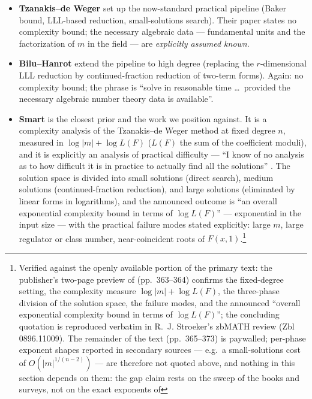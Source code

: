 \documentclass[11pt]{amsart}
\theoremstyle{plain}
\theoremstyle{remark}
\begin{document}
\begin{itemize}
\item \textbf{Tzanakis--de Weger} \cite{TdW89} set up the now-standard
  practical pipeline (Baker bound, LLL-based reduction,
  small-solutions search). Their paper states no complexity bound; the
  necessary algebraic data --- fundamental units and the factorization
  of $m$ in the field --- are \emph{explicitly assumed known}.
\item \textbf{Bilu--Hanrot} \cite{BH96} extend the pipeline to high
  degree (replacing the $r$-dimensional LLL reduction by
  continued-fraction reduction of two-term forms). Again: no
  complexity bound; the phrase is ``solve in reasonable time \dots\
  provided the necessary algebraic number theory data is available''.
\item \textbf{Smart} \cite{Sma96} is the closest prior and the work we
  position against. It is a complexity analysis of the Tzanakis--de
  Weger method at fixed degree $n$, measured in $\log|m| + \log L(F)$
  ($L(F)$ the sum of the coefficient moduli), and it is explicitly an
  analysis of practical difficulty --- ``I know of no analysis as to
  how difficult it is in practice to actually find all the
  solutions'' \cite[p.~363]{Sma96}. The solution space is divided into
  small solutions (direct search), medium solutions
  (continued-fraction reduction), and large solutions (eliminated by
  linear forms in logarithms), and the announced outcome is ``an
  overall exponential complexity bound in terms of $\log L(F)$''
  \cite[p.~364]{Sma96} --- exponential in the input size --- with the
  practical failure modes stated explicitly: large $m$, large
  regulator or class number, near-coincident roots of
  $F(x,1)$.\footnote{Verified against the openly available portion of
    the primary text: the publisher's two-page preview of \cite{Sma96}
    (pp.~363--364) confirms the fixed-degree setting, the complexity
    measure $\log|m| + \log L(F)$, the three-phase division of the
    solution space, the failure modes, and the announced ``overall
    exponential complexity bound in terms of $\log L(F)$''; the
    concluding quotation is reproduced verbatim in R.~J. Stroeker's
    zbMATH review (Zbl 0896.11009). The remainder of the text
    (pp.~365--373) is paywalled; per-phase exponent shapes reported in
    secondary sources --- e.g.\ a small-solutions cost of
    $O(|m|^{1/(n-2)})$ --- are therefore not quoted above, and nothing
    in this section depends on them: the gap claim rests on the sweep
    of the books and surveys, not on the exact exponents of
}
\end{itemize}
\end{document}
